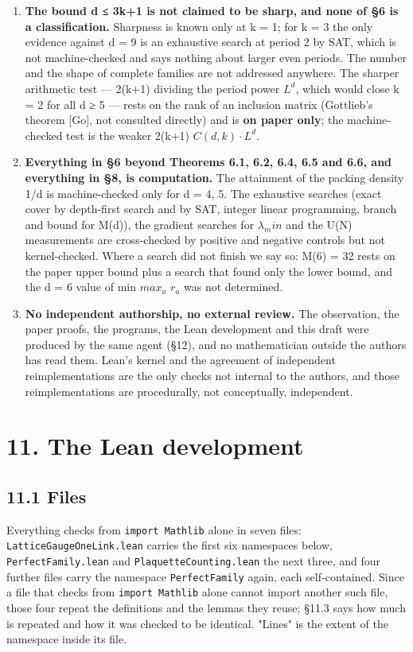 \documentclass[11pt,a4paper]{article}
\theoremstyle{named}
\begin{document}
\begin{enumerate}
\item[6.] \textbf{The bound d ≤ 3k+1 is not claimed to be sharp, and none of §6 is a classification.} Sharpness is known only at k = 1; for k = 3 the only evidence against d = 9 is an exhaustive search at period 2 by SAT, which is not machine-checked and says nothing about larger even periods. The number and the shape of complete families are not addressed anywhere. The sharper arithmetic test — 2(k+1) dividing the period power $L^d$, which would close k = 2 for all d ≥ 5 — rests on the rank of an inclusion matrix (Gottlieb's theorem [Go], not consulted directly) and is \textbf{on paper only}; the machine-checked test is the weaker 2(k+1) \textbar{} $C(d,k)·L^d$.
\item[7.] \textbf{Everything in §6 beyond Theorems 6.1, 6.2, 6.4, 6.5 and 6.6, and everything in §8, is computation.} The attainment of the packing density 1/d is machine-checked only for d = 4, 5. The exhaustive searches (exact cover by depth-first search and by SAT, integer linear programming, branch and bound for M(d)), the gradient searches for $λ_min$ and the U(N) measurements are cross-checked by positive and negative controls but not kernel-checked. Where a search did not finish we say so: M(6) = 32 rests on the paper upper bound plus a search that found only the lower bound, and the d = 6 value of min $max_a$ $r_a$ was not determined.
\item[8.] \textbf{No independent authorship, no external review.} The observation, the paper proofs, the programs, the Lean development and this draft were produced by the same agent (§12), and no mathematician outside the authors has read them. Lean's kernel and the agreement of independent reimplementations are the only checks not internal to the authors, and those reimplementations are procedurally, not conceptually, independent.
\end{enumerate}

\section*{11. The Lean development}

\subsection*{11.1 Files}
Everything checks from \texttt{import\ \allowbreak{}Mathlib} alone in seven files: \texttt{LatticeGaugeOneLink.\allowbreak{}lean} carries the first six namespaces below, \texttt{PerfectFamily.\allowbreak{}lean} and \texttt{PlaquetteCounting.\allowbreak{}lean} the next three, and four further files carry the namespace \texttt{PerfectFamily} again, each self-contained. Since a file that checks from \texttt{import\ \allowbreak{}Mathlib} alone cannot import another such file, those four repeat the definitions and the lemmas they reuse; §11.3 says how much is repeated and how it was checked to be identical. "Lines" is the extent of the namespace inside its file.
\end{document}
